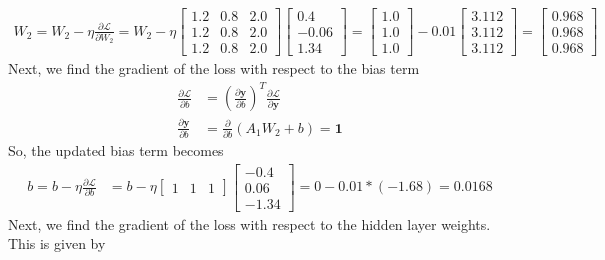 \documentclass[12pt]{article}
\begin{document}
    \begin{align*}
        W_{2} = W_{2} - \eta \frac{\partial \mathcal{L}}{\partial W_{2}}
        = W_{2} - \eta \begin{bmatrix}
            1.2 & 0.8 & 2.0 \\
            1.2 & 0.8 & 2.0 \\
            1.2 & 0.8 & 2.0
        \end{bmatrix} \begin{bmatrix}
            0.4 \\ -0.06 \\ 1.34
        \end{bmatrix} = \begin{bmatrix}
            1.0 \\ 1.0 \\ 1.0
        \end{bmatrix} - 0.01 \begin{bmatrix}
            3.112 \\ 3.112 \\ 3.112
        \end{bmatrix} = \begin{bmatrix}
            0.968 \\ 0.968 \\ 0.968
        \end{bmatrix}
    \end{align*}
    Next, we find the gradient of the loss with respect to the bias term
    \begin{align*}
        \frac{\partial \mathcal{L}}{\partial b} &= \left( \frac{\partial \mathbf{y}}{\partial b} \right)^{T} \frac{\partial \mathcal{L}}{\partial \mathbf{y}} \\
        \frac{\partial \mathbf{y}}{\partial b} &= \frac{\partial}{\partial b} (A_{1} W_{2} + b) = \mathbf{1}
    \end{align*}
    So, the updated bias term becomes
    \begin{align*}
        b = b - \eta \frac{\partial \mathcal{L}}{\partial b} &= b - \eta \begin{bmatrix}
            1 & 1 & 1
        \end{bmatrix} \begin{bmatrix}
            -0.4 \\ 0.06 \\ -1.34
        \end{bmatrix} = 0 - 0.01 * (-1.68) = 0.0168
    \end{align*}
    Next, we find the gradient of the loss with respect to the hidden layer weights. This is given by
\end{document}
